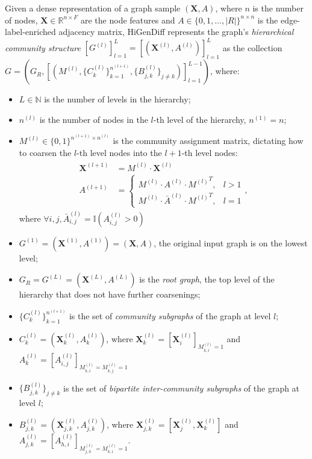Given a dense representation of a graph sample $(\mathbf{X},A)$, where $n$ is the number of nodes, $\mathbf{X} \in \mathbb{R}^{n \times F}$ are the node features and $A \in \{0,1,\dots,|R|\}^{n \times n}$ is the edge-label-enriched adjacency matrix, HiGenDiff represents the graph's \emph{hierarchical community structure} $[G^{(l)}]_{l=1}^{L}=[(\mathbf{X}^{(l)},A^{(l)})]_{l=1}^{L}$ as the collection $G=(G_R,[(M^{(l)}, \{C^{(l)}_{k}\}_{k=1}^{n^{(l+1)}},\{B^{(l)}_{j,k}\}_{j \neq k})]_{l=1}^{L-1})$, where:
\begin{itemize}
    \item $L \in \mathbb{N}$ is the number of levels in the hierarchy;
    \item $n^{(l)}$ is the number of nodes in the $l$-th level of the hierarchy, $n^{(1)}=n$;
    \item $M^{(l)} \in \{0,1\}^{n^{(l+1)} \times n^{(l)}}$ is the community assignment matrix, dictating how to coarsen the $l$-th level nodes into the $l+1$-th level nodes:
    \begin{align}
        \begin{split}
            \mathbf{X}^{(l+1)}&=M^{(l)} \cdot \mathbf{X}^{(l)} \\
            A^{(l+1)}&=\begin{cases}
                M^{(l)} \cdot A^{(l)} \cdot {M^{(l)}}^T, & l>1 \\
                M^{(l)} \cdot \bar{A}^{(l)} \cdot {M^{(l)}}^T, & l=1
            \end{cases},
        \end{split}
    \end{align}
    where $\forall i,j, \bar{A}^{(l)}_{i,j}=\mathbb{I}(A^{(l)}_{i,j}>0)$
    \item $G^{(1)}=(\mathbf{X}^{(1)},A^{(1)})=(\mathbf{X},A)$, the original input graph is on the lowest level;
    \item $G_R=G^{(L)}=(\mathbf{X}^{(L)}, A^{(L)})$ is the \emph{root graph}, the top level of the hierarchy that does not have further coarsenings;
    \item $\{C^{(l)}_{k}\}_{k=1}^{n^{(l+1)}}$ is the set of \emph{community subgraphs} of the graph at level $l$;
    \item $C^{(l)}_{k}=(\mathbf{X}_k^{(l)},A_k^{(l)})$, where $\mathbf{X}_k^{(l)}=[\mathbf{X}_i^{(l)}]_{M^{(l)}_{k,i}=1}$ and $A_k^{(l)}=[A_{i,j}^{(l)}]_{M^{(l)}_{k,i}=M^{(l)}_{k,j}=1}$
    \item $\{B^{(l)}_{j,k}\}_{j \neq k}$ is the set of \emph{bipartite inter-community subgraphs} of the graph at level $l$;
    \item $B^{(l)}_{j,k}=(\mathbf{X}_{j,k}^{(l)},A_{j,k}^{(l)})$, where $\mathbf{X}_{j,k}^{(l)}=[\mathbf{X}_{j}^{(l)},\mathbf{X}_{k}^{(l)}]$ and $A_{j,k}^{(l)}=[A_{h,i}^{(l)}]_{M^{(l)}_{j,h}=M^{(l)}_{k,i}=1}$.
\end{itemize}

